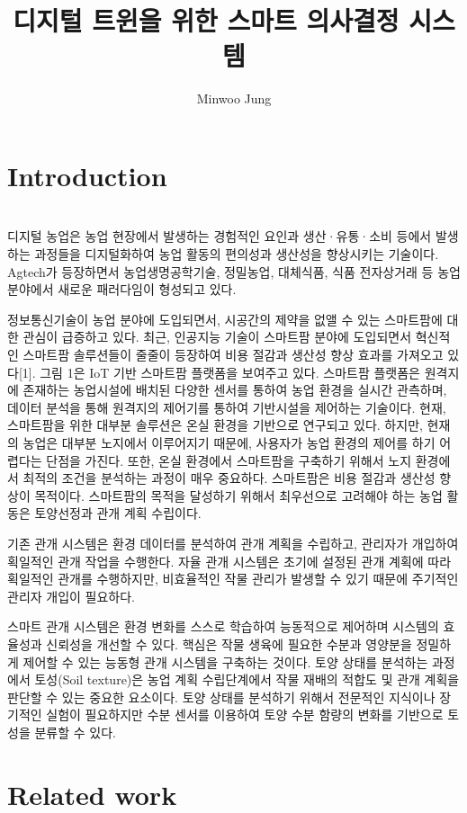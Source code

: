 \documentclass[11pt]{article}
\title{디지털 트윈을 위한 스마트 의사결정 시스템}
\author{Minwoo Jung}
\begin{document}
\maketitle

\section{Introduction}
\indent \\디지털 농업은 농업 현장에서 발생하는 경험적인 요인과 생산·유통·소비 등에서 발생하는 과정들을 디지털화하여 농업 활동의 편의성과 생산성을 향상시키는 기술이다. Agtech가 등장하면서 농업생명공학기술, 정밀농업, 대체식품, 식품 전자상거래 등 농업 분야에서 새로운 패러다임이 형성되고 있다.

정보통신기술이 농업 분야에 도입되면서, 시공간의 제약을 없앨 수 있는 스마트팜에 대한 관심이 급증하고 있다. 최근, 인공지능 기술이 스마트팜 분야에 도입되면서 혁신적인 스마트팜 솔루션들이 줄줄이 등장하여 비용 절감과 생산성 향상 효과를 가져오고 있다[1]. 그림 1은 IoT 기반 스마트팜 플랫폼을 보여주고 있다. 스마트팜 플랫폼은 원격지에 존재하는 농업시설에 배치된 다양한 센서를 통하여 농업 환경을 실시간 관측하며, 데이터 분석을 통해 원격지의 제어기를 통하여 기반시설을 제어하는 기술이다. 현재, 스마트팜을 위한 대부분 솔루션은 온실 환경을 기반으로 연구되고 있다. 하지만, 현재의 농업은 대부분 노지에서 이루어지기 때문에, 사용자가 농업 환경의 제어를 하기 어렵다는 단점을 가진다. 또한, 온실 환경에서 스마트팜을 구축하기 위해서 노지 환경에서 최적의 조건을 분석하는 과정이 매우 중요하다. 스마트팜은 비용 절감과 생산성 향상이 목적이다. 스마트팜의 목적을 달성하기 위해서 최우선으로 고려해야 하는 농업 활동은 토양선정과 관개 계획 수립이다.

기존 관개 시스템은 환경 데이터를 분석하여 관개 계획을 수립하고, 관리자가 개입하여 획일적인 관개 작업을 수행한다. 자율 관개 시스템은 초기에 설정된 관개 계획에 따라 획일적인 관개를 수행하지만, 비효율적인 작물 관리가 발생할 수 있기 때문에 주기적인 관리자 개입이 필요하다.

스마트 관개 시스템은 환경 변화를 스스로 학습하여 능동적으로 제어하며 시스템의 효율성과 신뢰성을 개선할 수 있다. 핵심은 작물 생육에 필요한 수분과 영양분을 정밀하게 제어할 수 있는 능동형 관개 시스템을 구축하는 것이다. 토양 상태를 분석하는 과정에서 토성(Soil texture)은 농업 계획 수립단계에서 작물 재배의 적합도 및 관개 계획을 판단할 수 있는 중요한 요소이다. 토양 상태를 분석하기 위해서 전문적인 지식이나 장기적인 실험이 필요하지만 수분 센서를 이용하여 토양 수분 함량의 변화를 기반으로 토성을 분류할 수 있다.



\section{Related work}
\indent \\
\end{document}

